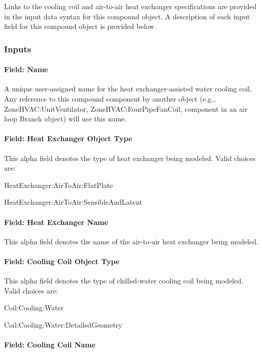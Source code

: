 Links to the cooling coil and air-to-air heat exchanger specifications are provided in the input data syntax for this compound object. A description of each input field for this compound object is provided below.

\subsubsection{Inputs}\label{inputs-26}

\paragraph{Field: Name}\label{field-name-25-000}

A unique user-assigned name for the heat exchanger-assisted water cooling coil. Any reference to this compound component by another object (e.g., ZoneHVAC:UnitVentilator, ZoneHVAC:FourPipeFanCoil, component in an air loop Branch object) will use this name.

\paragraph{Field: Heat Exchanger Object Type}\label{field-heat-exchanger-object-type-1}

This alpha field denotes the type of heat exchanger being modeled. Valid choices are:

HeatExchanger:AirToAir:FlatPlate

HeatExchanger:AirToAir:SensibleAndLatent

\paragraph{Field: Heat Exchanger Name}\label{field-heat-exchanger-name-1}

This alpha field denotes the name of the air-to-air heat exchanger being modeled.

\paragraph{Field: Cooling Coil Object Type}\label{field-cooling-coil-object-type-2}

This alpha field denotes the type of chilled-water cooling coil being modeled. Valid choices are:

Coil:Cooling:Water

Coil:Cooling:Water:DetailedGeometry

\paragraph{Field: Cooling Coil Name}\label{field-cooling-coil-name-2}

